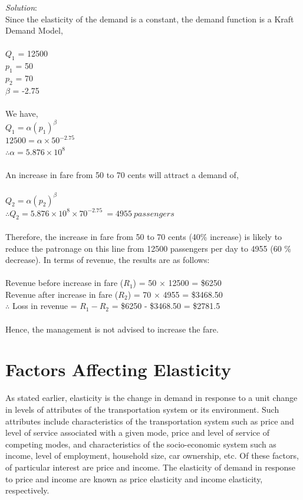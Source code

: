 \textit{Solution}:\\
Since the elasticity of the demand is a constant, the demand function is a Kraft Demand Model,\\\\
$Q_1$ = 12500\\
$p_1$ = 50\\
$p_2$ = 70\\
$\beta$ = -2.75\\\\
We have,\\
$ Q_1 = \alpha (p_1)^\beta$\\
$ 12500 = \alpha \times 50^{-2.75}$\\
$\therefore \alpha = 5.876 \times 10^{8}$\\\\
An increase in fare from 50 to 70 cents will attract a demand of,\\\\
$ Q_2 = \alpha (p_2)^\beta$\\
$ \therefore Q_2 = 5.876 \times 10^{8} \times 70^{-2.75} \: = 4955 \: passengers$\\\\
Therefore, the increase in fare from 50 to 70 cents (40\% increase) is likely to reduce the patronage on this line from 12500 passengers per day to 4955 (60 \% decrease). In terms of revenue, the results are as follows:\\\\
Revenue before increase in fare ($R_1$) = 50 $\times$ 12500 = \$6250\\
Revenue after increase in fare ($R_2$) = 70 $\times$ 4955 = \$3468.50\\
$\therefore$ Loss in revenue = $ R_1 - R_2$ = \$6250 - \$3468.50 = \$2781.5\\\\
Hence, the management is not advised to increase the fare.
%
\section{Factors Affecting Elasticity}
As stated earlier, elasticity is the change in demand in response to a unit change in levels of attributes of the transportation system or its environment. Such attributes include characteristics of the transportation system such as price and level of service associated with a given mode, price and level of service of competing modes, and characteristics of the socio-economic system such as income, level of employment, household size, car ownership, etc. Of these factors, of particular interest are price and income. The elasticity of demand in response to price and income are known as price elasticity and income elasticity, respectively.
